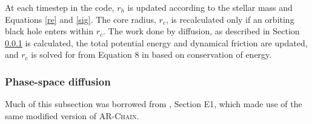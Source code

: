 \documentclass[fleqn,usenatbib,useAMS]{mnras}
\begin{document}
At each timestep in the code, $r_h$ is updated according to the stellar mass and Equations \ref{re} and \ref{sig}.  The core radius, $r_c$, is recalculated only if an orbiting black hole enters within $r_c$.  The work done by diffusion, as described in Section \ref{psd} is calculated, the total potential energy and dynamical friction are updated, and $r_c$ is solved for from Equation 8 in \citet{2015ApJ...806L..28S} based on conservation of energy.

\subsubsection{Phase-space diffusion} \label{psd}
Much of this subsection was borrowed from \citet{2017MNRAS.467.4180S}, Section E1, which made use of the same modified version of \textsc{AR-Chain}.
\end{document}
